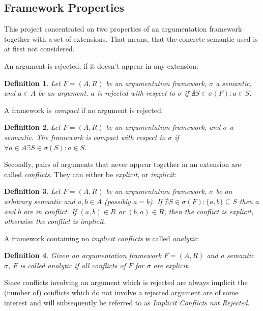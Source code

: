 \documentclass[parskip=half]{scrartcl}
\newtheorem{definition}{Definition}
\begin{document}
\subsection{Framework Properties} \label{framework_props}
This project concentrated on two properties of an argumentation framework
together with a set of extensions. That means, that the concrete semantic used
is at first not considered.

An argument is rejected, if it doesn't appear in any extension:

\begin{definition}
Let $F=(A,R)$ be an argumentation framework, $\sigma$ a semantic, and $a\in A$
be an argument. $a$ is \emph{rejected} with respect to $\sigma$ if $\nexists S\in\sigma(F): a\in S$.
\end{definition}

A framework is \emph{compact} if no argument is rejected:

\begin{definition}
Let $F=(A,R)$ be an argumentation framework, and $\sigma$ a semantic.  The
framework is \emph{compact} with respect to $\sigma$ if $\forall a\in A\exists
S\in\sigma(S):a\in S$.
\end{definition}

Secondly, pairs of arguments that never appear together in an extension
are called \emph{conflicts}. They can either be \emph{explicit}, or
\emph{implicit}:
\begin{definition}
  Let $F=(A,R)$ be an argumentation framework, $\sigma$ be an arbitrary semantic
  and $a, b\in A$ (possibly $a = b$). If $\nexists S \in \sigma(F): \{a,b\} \subseteq S$ then $a$ and
  $b$ are in \emph{conflict}. If $(a, b) \in R$ or $(b, a)\in R$, then the
  conflict is \emph{explicit}, otherwise the conflict is \emph{implicit}.
\end{definition}

A framework containing no \emph{implicit conflicts} is called \emph{analytic}:

\begin{definition}
Given an argumentation framework $F=(A,R)$ and a semantic $\sigma$, $F$ is
called \emph{analytic} if all conflicts of $F$ for $\sigma$ are explicit.
\end{definition}

Since conflicts involving an argument which is rejected are always
implicit the (number of) conflicts which do not involve a rejected
argument are of some interest and will subsequently be referred to as
\emph{Implicit Conflicts not Rejected}.
\end{document}
